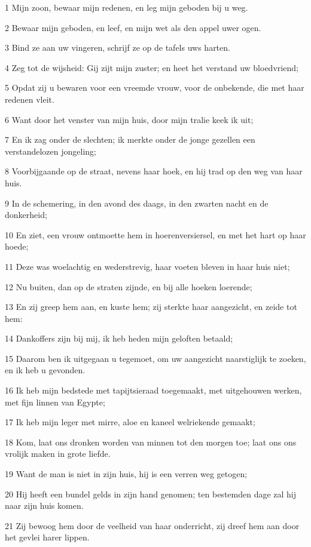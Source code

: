 \par 1 Mijn zoon, bewaar mijn redenen, en leg mijn geboden bij u weg.
\par 2 Bewaar mijn geboden, en leef, en mijn wet als den appel uwer ogen.
\par 3 Bind ze aan uw vingeren, schrijf ze op de tafels uws harten.
\par 4 Zeg tot de wijsheid: Gij zijt mijn zuster; en heet het verstand uw bloedvriend;
\par 5 Opdat zij u bewaren voor een vreemde vrouw, voor de onbekende, die met haar redenen vleit.
\par 6 Want door het venster van mijn huis, door mijn tralie keek ik uit;
\par 7 En ik zag onder de slechten; ik merkte onder de jonge gezellen een verstandelozen jongeling;
\par 8 Voorbijgaande op de straat, nevens haar hoek, en hij trad op den weg van haar huis.
\par 9 In de schemering, in den avond des daags, in den zwarten nacht en de donkerheid;
\par 10 En ziet, een vrouw ontmoette hem in hoerenversiersel, en met het hart op haar hoede;
\par 11 Deze was woelachtig en wederstrevig, haar voeten bleven in haar huis niet;
\par 12 Nu buiten, dan op de straten zijnde, en bij alle hoeken loerende;
\par 13 En zij greep hem aan, en kuste hem; zij sterkte haar aangezicht, en zeide tot hem:
\par 14 Dankoffers zijn bij mij, ik heb heden mijn geloften betaald;
\par 15 Daarom ben ik uitgegaan u tegemoet, om uw aangezicht naarstiglijk te zoeken, en ik heb u gevonden.
\par 16 Ik heb mijn bedstede met tapijtsieraad toegemaakt, met uitgehouwen werken, met fijn linnen van Egypte;
\par 17 Ik heb mijn leger met mirre, aloe en kaneel welriekende gemaakt;
\par 18 Kom, laat ons dronken worden van minnen tot den morgen toe; laat ons ons vrolijk maken in grote liefde.
\par 19 Want de man is niet in zijn huis, hij is een verren weg getogen;
\par 20 Hij heeft een bundel gelds in zijn hand genomen; ten bestemden dage zal hij naar zijn huis komen.
\par 21 Zij bewoog hem door de veelheid van haar onderricht, zij dreef hem aan door het gevlei harer lippen.

